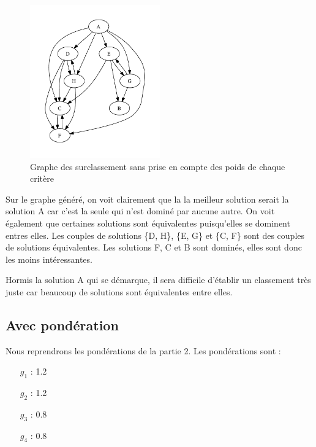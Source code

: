 \clearpage

\begin{figure}[!h]
\begin{center}
\includegraphics[width=0.5\textwidth]{../SourcesMatlab/electre3-1.pdf}
\caption{Graphe des surclassement sans prise en compte des poids de chaque critère}
\end{center}
\end{figure}

Sur le graphe généré, on voit clairement que la la meilleur solution serait la
solution A car c'est la seule qui n'est dominé par aucune autre.
On voit également que certaines solutions sont équivalentes puisqu'elles se
dominent entres elles. Les couples de solutions \{D, H\}, \{E, G\} et \{C, F\}
sont des couples de solutions équivalentes.
Les solutions F, C et B sont dominés, elles sont donc les moins intéressantes.

Hormis la solution A qui se démarque, il sera difficile d'établir un classement très juste car beaucoup de solutions sont équivalentes entre elles.

\subsection{Avec pondération}

Nous reprendrons les pondérations de la partie 2.
Les pondérations sont :
\begin{itemize}
\item[$g_1$] : 1.2
\item[$g_2$] : 1.2
\item[$g_3$] : 0.8
\item[$g_4$] : 0.8
\end{itemize}

